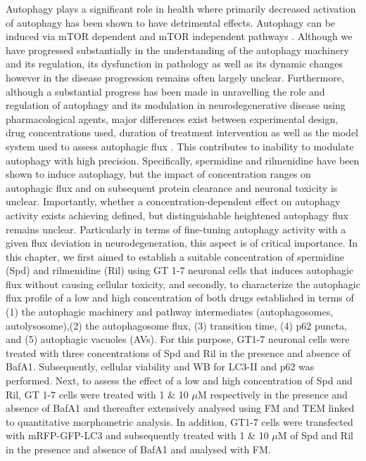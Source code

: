 Autophagy plays a significant role in health where primarily decreased activation of autophagy has been shown to have detrimental effects. Autophagy can be induced via mTOR dependent and mTOR independent pathways \citep{sarkar2013}. Although we have progressed substantially in the understanding of the autophagy machinery and its regulation, its dysfunction in pathology as well as its dynamic changes however in the disease progression remains often largely unclear. Furthermore, although a substantial progress has been made in unravelling the role and regulation of autophagy and its modulation in neurodegenerative disease using pharmacological agents, major differences exist between experimental design, drug concentrations used, duration of treatment intervention as well as the model system used to assess autophagic flux \citep{lumkwana2017}. This contributes to inability to modulate autophagy with high precision. Specifically, spermidine and rilmenidine have been shown to induce autophagy, but the impact of concentration ranges on autophagic flux and on subsequent protein clearance and neuronal toxicity is unclear. Importantly, whether a concentration-dependent effect on autophagy activity exists achieving defined, but distinguishable heightened autophagy flux remains unclear. Particularly in terms of fine-tuning autophagy activity with a given flux deviation in neurodegeneration, this aspect is of critical importance. In this chapter, we first aimed to establish a suitable concentration of spermidine (Spd) and rilmenidine (Ril) using GT 1-7 neuronal cells that induces autophagic flux without causing cellular toxicity, and secondly, to characterize the autophagic flux profile of a low and high concentration of both drugs established in terms of (1) the autophagic machinery and pathway intermediates (autophagosomes, autolysosome),(2) the autophagosome flux, (3) transition time, (4) p62 puncta, and (5) autophagic vacuoles (AVs). For this purpose, GT1-7 neuronal cells were treated with three concentrations of Spd and Ril in the presence and absence of BafA1. Subsequently, cellular viability and WB for LC3-II and p62 was performed. Next, to assess the effect of a low and high concentration of Spd and Ril, GT 1-7 cells were treated with 1 \& 10 $\mu$M respectively in the presence and absence of BafA1 and thereafter extensively analysed using FM and TEM linked to quantitative morphometric analysis. In addition, GT1-7 cells were transfected with mRFP-GFP-LC3 \citep{yoshii2017} and subsequently treated with 1 \& 10 $\mu$M of Spd and Ril in the presence and absence of BafA1 and analysed with FM.
 
